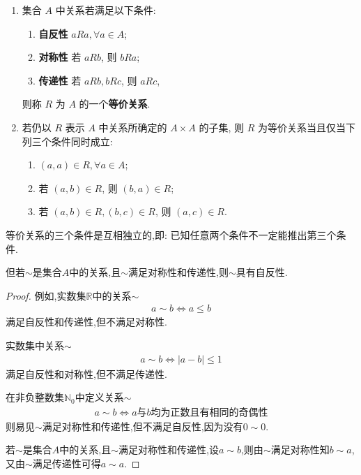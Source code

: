 \documentclass[../../main.tex]{subfiles}%
\begin{document}
\begin{definition}[等价关系]
\begin{enumerate}
\item 集合 \( A \) 中关系若满足以下条件:
\begin{enumerate}[(1)]
\item \textbf{自反性} \( aRa, \forall a \in A \);

\item \textbf{对称性} 若 \( aRb \), 则 \( bRa \);

\item \textbf{传递性} 若 \( aRb, bRc \), 则 \( aRc \),
\end{enumerate}
则称 \( R \) 为 \( A \) 的一个\textbf{等价关系}.

\item 若仍以 \( R \) 表示 \( A \) 中关系所确定的 \( A \times A \) 的子集, 则 \( R \) 为等价关系当且仅当下列三个条件同时成立:
\begin{enumerate}[(1)]
\item \( (a,a) \in R, \forall a \in A \);

\item 若 \( (a,b) \in R \), 则 \( (b,a) \in R \);

\item 若 \( (a,b) \in R, (b,c) \in R \), 则 \( (a,c) \in R \).
\end{enumerate}
\end{enumerate}
\end{definition}
\begin{remark}
等价关系的三个条件是互相独立的,即: 已知任意两个条件不一定能推出第三个条件.

但若$\sim $是集合$A$中的关系,且$\sim$满足对称性和传递性,则$\sim$具有自反性.
\begin{proof}
例如,实数集$\mathbb{R}$中的关系$\sim$
\begin{align*}
a\sim b\iff a\leqslant b
\end{align*}
满足自反性和传递性,但不满足对称性.

实数集中关系$\sim$
\begin{align*}
a \sim b \iff |a - b| \leqslant 1
\end{align*}
满足自反性和对称性,但不满足传递性.

在非负整数集$\mathbb{N}_0$中定义关系$\sim$
\begin{align*}
a \sim b \iff a\text{与}b\text{均为正数且有相同的奇偶性}
\end{align*}
则易见$\sim$满足对称性和传递性,但不满足自反性,因为没有$0 \sim 0$.

若$\sim $是集合$A$中的关系,且$\sim$满足对称性和传递性,设$a\sim b$,则由$\sim$满足对称性知$b\sim a$,又由$\sim $满足传递性可得$a\sim a$.
\end{proof}
\end{remark}
\end{document}
